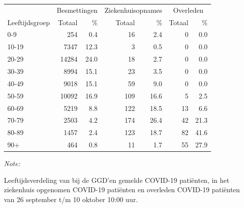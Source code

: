 \documentclass[
  english,
  man,floatsintext]{apa6}
\begin{document}
\begin{table}[H]
\centering\begingroup\fontsize{11}{13}\selectfont

\begin{threeparttable}
\begin{tabular}{lrrrrrr}
\toprule
\multicolumn{1}{c}{ } & \multicolumn{2}{c}{Besmettingen} & \multicolumn{2}{c}{Ziekenhuisopnames} & \multicolumn{2}{c}{Overleden} \\
\cmidrule(l{3pt}r{3pt}){2-3} \cmidrule(l{3pt}r{3pt}){4-5} \cmidrule(l{3pt}r{3pt}){6-7}
Leeftijdsgroep & Totaal & \% & Totaal & \% & Totaal & \%\\
\midrule
0-9 & 254 & 0.4 & 16 & 2.4 & 0 & 0.0\\
10-19 & 7347 & 12.3 & 3 & 0.5 & 0 & 0.0\\
20-29 & 14284 & 24.0 & 18 & 2.7 & 0 & 0.0\\
30-39 & 8994 & 15.1 & 23 & 3.5 & 0 & 0.0\\
40-49 & 9018 & 15.1 & 59 & 9.0 & 0 & 0.0\\
50-59 & 10092 & 16.9 & 109 & 16.6 & 5 & 2.5\\
60-69 & 5219 & 8.8 & 122 & 18.5 & 13 & 6.6\\
70-79 & 2503 & 4.2 & 174 & 26.4 & 42 & 21.3\\
80-89 & 1457 & 2.4 & 123 & 18.7 & 82 & 41.6\\
90+ & 464 & 0.8 & 11 & 1.7 & 55 & 27.9\\
\bottomrule
\end{tabular}
\begin{tablenotes}
\item \textit{Note: } 
\item Leeftijdsverdeling van bij de GGD’en gemelde COVID-19 patiënten, in het ziekenhuis opgenomen COVID-19 patiënten en overleden COVID-19 patiënten van 26 september t/m 10 oktober 10:00 uur.
\end{tablenotes}
\end{threeparttable}
\endgroup{}
\end{table}
\end{document}
